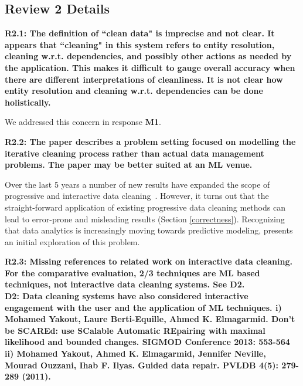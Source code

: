 \subsection*{Review 2 Details}

\noindent\textbf{R2.1: The definition of ``clean data" is imprecise and not clear. It appears that ``cleaning" in this system refers to entity resolution, cleaning w.r.t. dependencies, and possibly other actions as needed by the application. This makes it difficult to gauge overall accuracy when there are different interpretations of cleanliness. It is not clear how entity resolution and cleaning w.r.t. dependencies can be done holistically.}

We addressed this concern in response \textbf{M1}.

\vspace{0.5em}

\noindent\textbf{R2.2: The paper describes a problem setting focused on modelling the iterative cleaning process rather than actual data management problems. The paper may be better suited at an ML venue.}

Over the last 5 years a number of new results have expanded the scope of progressive and interactive data cleaning~\cite{mayfield2010eracer, DBLP:journals/pvldb/YakoutENOI11, yakout2013don, altowim2014progressive, whang2014incremental, papenbrock2015progressive, gruenheid2014incremental}.
However,  it turns out that the straight-forward application of existing progressive data cleaning methods can lead to error-prone and misleading results (Section \ref{correctness}).
Recognizing that data analytics is increasingly moving towards predictive modeling, \sys presents an initial exploration of this problem.  

\vspace{0.5em}

\noindent\textbf{R2.3: Missing references to related work on interactive data cleaning. For the comparative evaluation, 2/3 techniques are ML based techniques, not interactive data cleaning systems. See D2.\\
D2: Data cleaning systems have also considered interactive engagement with the user and the application of ML techniques. 
i) Mohamed Yakout, Laure Berti-Equille, Ahmed K. Elmagarmid. Don't be SCAREd: use SCalable Automatic REpairing with maximal likelihood and bounded changes. SIGMOD Conference 2013: 553-564
ii) Mohamed Yakout, Ahmed K. Elmagarmid, Jennifer Neville, Mourad Ouzzani, Ihab F. Ilyas.
Guided data repair. PVLDB 4(5): 279-289 (2011).
}


